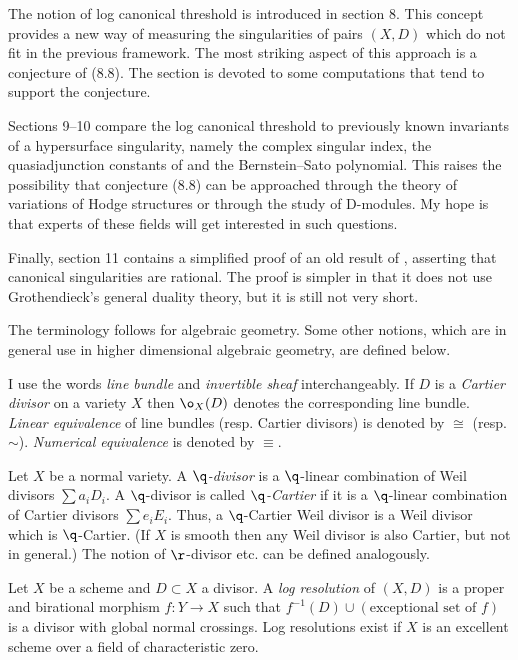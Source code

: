 The notion of log canonical threshold is introduced in section 8. This
concept provides a new way of measuring the singularities of pairs $(X,D)$
which do not fit in the previous framework. The most striking aspect of this
approach is a conjecture of \cite{Shokurov92} (8.8). The section is devoted
to  some computations that tend to support the conjecture.

Sections 9--10 compare the log canonical threshold to previously known
invariants of a hypersurface singularity, namely the complex singular index,
the quasiadjunction constants of \cite{Libgober83}
and the Bernstein--Sato polynomial. This raises the possibility that
conjecture (8.8) can be approached through the theory of variations of Hodge
structures or through the study of D-modules.  My hope is that experts of
these fields will get interested in such questions.

Finally, section 11 contains a simplified proof of an old result of
\cite{Elkik81; Flenner81}, asserting  that canonical singularities are
rational.  The proof is simpler in that it does not use Grothendieck's general
duality theory, but it is still not very short.
\enddemo


The terminology follows  \cite{Hartshorne77} for algebraic geometry. Some
other  notions, which are in general use in higher dimensional algebraic
geometry, are defined below.



 I use the words {\it line bundle} and {\it invertible
sheaf} interchangeably. If $D$ is a {\it Cartier divisor} on a variety $X$ then
$\o_X(D)$ denotes the corresponding line bundle. {\it Linear equivalence} of
line bundles (resp. Cartier divisors) is denoted by $\cong$ (resp. 
$\sim$).  {\it Numerical equivalence} is denoted by $\equiv$.
\enddemo

 Let $X$ be a normal variety. A {\it $\q$-divisor}  is a
$\q$-linear combination of Weil  divisors $\sum a_iD_i$.  A  $\q$-divisor
 is called {\it $\q$-Cartier} if 
it is a
$\q$-linear combination of Cartier  divisors $\sum e_iE_i$. Thus, a
$\q$-Cartier Weil divisor is a Weil divisor which is $\q$-Cartier. 
(If $X$ is smooth then any Weil divisor is also Cartier, but not in general.)
The notion of $\r$-divisor etc. can be defined analogously. 
\enddemo


  Let $X$ be a scheme and $D\subset X$ a divisor. A {\it log
resolution} of $(X,D)$ is a proper and birational morphism $f:Y\to X$
such that $f^{-1}(D)\cup (\text{exceptional set of $f$})$ is a divisor with
global normal crossings. Log resolutions exist if $X$ is an excellent scheme
over a field of characteristic zero. 
\enddemo


